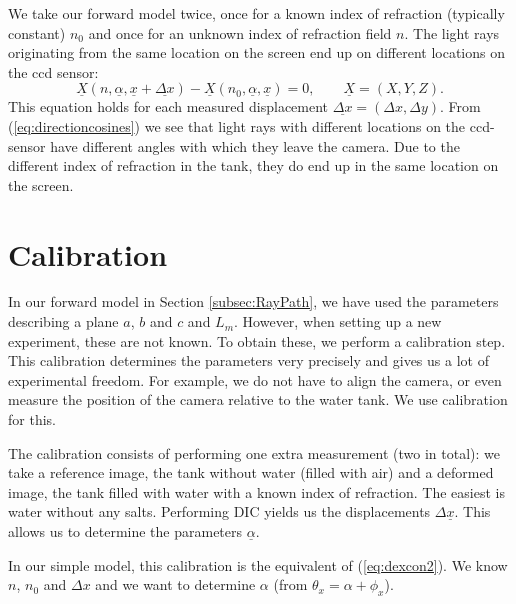 \documentclass{article}
\begin{document}
We take our forward model twice, once for a known index of refraction (typically constant) $n_0$ and once for an unknown index of refraction field $n$. The light rays originating from the same location on the screen end up on different locations on the ccd sensor:
\begin{equation}
\label{eq:ForwardModel}
	 \underline{X}(n, \underline{\alpha}, \underline{x}+\underline{\Delta x}) - \underline{X}(n_0, \underline{\alpha}, \underline{x}) = 0, \qquad \underline{X} = (X, Y, Z).
\end{equation}
This equation holds for each measured displacement $\underline{\Delta x} = (\Delta x, \Delta y)$. From (\ref{eq:directioncosines}) we see that light rays with different locations on the ccd-sensor have different angles with which they leave the camera. Due to the different index of refraction in the tank, they do end up in the same location on the screen.

\section{Calibration}
In our forward model in Section \ref{subsec:RayPath}, we have used the parameters describing a plane $a$, $b$ and $c$ and $L_m$. However, when setting up a new experiment, these are not known. To obtain these, we perform a calibration step. This calibration determines the parameters very precisely and gives us a lot of experimental freedom. For example, we do not have to align the camera, or even measure the position of the camera relative to the water tank. We use calibration for this.

The calibration consists of performing one extra measurement (two in total): we take a reference image, the tank without water (filled with air) and a deformed image, the tank filled with water with a known index of refraction. The easiest is water without any salts. Performing DIC yields us the displacements $\Delta \underline{x}$. This allows us to determine the parameters $\underline{\alpha}.$

In our simple model, this calibration is the equivalent of (\ref{eq:dexcon2}). We know $n$, $n_0$ and $\Delta x$ and we want to determine $\alpha$ (from $\theta_x = \alpha+\phi_x$).
\end{document}
